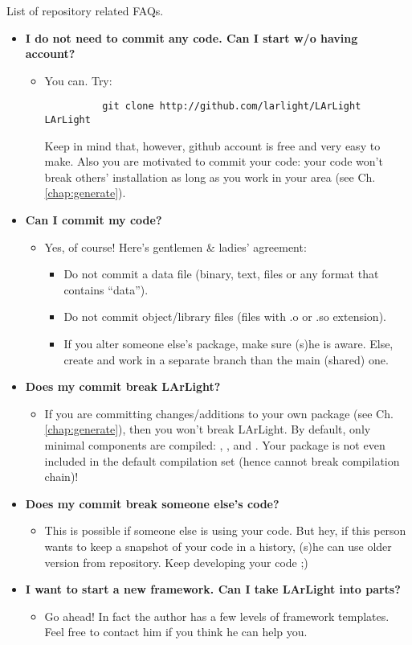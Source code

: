 List of repository related FAQs.

\begin{itemize}

  \item[]{\bf I do not need to commit any code. Can I start w/o having \git account?}
    \begin{itemize}
      \item You can. Try:
        \begin{lstlisting}
          git clone http://github.com/larlight/LArLight LArLight
        \end{lstlisting}
        Keep in mind that, however, github account is free and very easy to make. Also you are motivated to commit your code: your code won't break others' installation as long as you work in your area (see Ch.\ref{chap:generate}).
    \end{itemize}

  \item[]{\bf Can I commit my code?}
    \begin{itemize}
      \item Yes, of course! Here's gentlemen \& ladies' agreement:
        \begin{itemize}
          \item Do not commit a data file (binary, text, \ROOT files or any format that contains ``data'').
          \item Do not commit object/library files (files with {\ttfamily *.o} or {\ttfamily *.so} extension).
          \item If you alter someone else's package, make sure (s)he is aware. Else, create and work in a separate \git branch than the main (shared) one.
        \end{itemize}
    \end{itemize}

  \item[] {\bf Does my commit break LArLight?}
    \begin{itemize}
      \item If you are committing changes/additions to your own package (see Ch.\ref{chap:generate}), then you won't break LArLight. By default, only minimal components are compiled: \Base, \DataFormat, and \Analysis. Your package is not even included in the default compilation set (hence cannot break compilation chain)! 
    \end{itemize}

  \item[] {\bf Does my commit break someone else's code?}
    \begin{itemize}
      \item This is possible if someone else is using your code. But hey, if this person wants to keep a snapshot of your code in a history, (s)he can use older version from \git repository. Keep developing your code ;)
    \end{itemize}

  \item[] {\bf I want to start a new \CPP framework. Can I take LArLight into parts?}
    \begin{itemize}
      \item Go ahead! In fact the author has a few levels of framework templates. Feel free to contact him if you think he can help you.
    \end{itemize}

\end{itemize}
